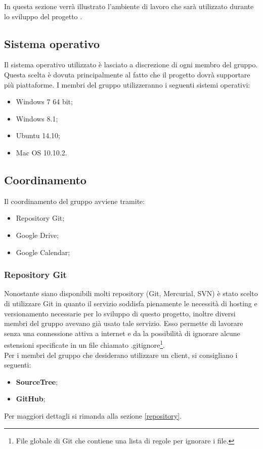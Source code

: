 In questa sezione verrà illustrato l'ambiente di lavoro che sarà utilizzato durante lo sviluppo del progetto \PROGETTO.\\

\subsection{Sistema operativo}

Il sistema operativo utilizzato è lasciato a discrezione di ogni membro del gruppo. Questa scelta è dovuta principalmente al fatto che il progetto dovrà supportare più piattaforme.
I membri del gruppo utilizzeranno i seguenti sistemi operativi:

\begin{itemize}
	\item \gls{Windows} 7 64 bit;
	\item \gls{Windows} 8.1;
	\item \gls{Ubuntu} 14.10;
	\item Mac OS 10.10.2.
\end{itemize}

\subsection{Coordinamento}

Il coordinamento del gruppo avviene tramite:
\begin{itemize}
	\item \gls{Repository} \gls{Git};
	\item \gls{Google Drive};
	\item \gls{Google Calendar};
\end{itemize}

\subsubsection{Repository Git}

Nonostante siano disponibili molti \gls{repository} (\gls{Git}, \gls{Mercurial}, \gls{SVN}) è stato scelto di utilizzare \gls{Git} in quanto il servizio soddisfa pienamente le necessità di \gls{hosting} e \gls{versionamento} necessarie per lo sviluppo di questo progetto, inoltre diversi membri del gruppo avevano già usato tale servizio. Esso permette di lavorare senza una connessione attiva a internet e da la possibilità di ignorare alcune estensioni specificate in un file chiamato .gitignore\footnote{File globale di \gls{Git} che contiene una lista di regole per ignorare i file.}.\\ Per i membri del gruppo che desiderano utilizzare un client, si consigliano i seguenti:
\begin{itemize}
	\item \textbf{SourceTree};
	\item \textbf{\gls{GitHub}};
\end{itemize}
Per maggiori dettagli si rimanda alla sezione \ref{repository}.

